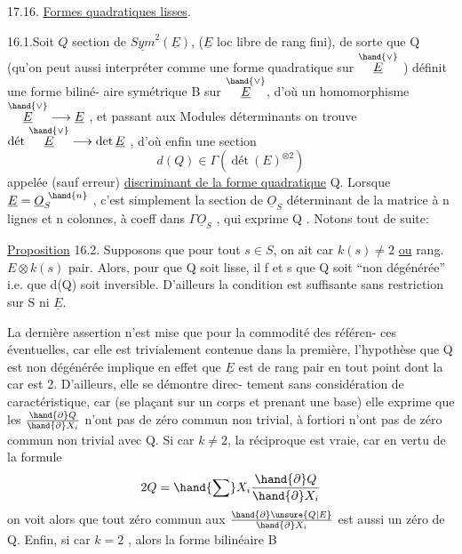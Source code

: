   

17.16. \uline{Formes quadratiques lisses}.

16.1.Soit $Q$  section de $\underline{Sym}^2(\underline{E})$, ($\underline{E}$ loc libre de rang fini),
de sorte que Q  (qu'on peut aussi interpréter comme une forme
quadratique sur $\overset{\hand{\vee}}{\underline{E}}$ )  définit une forme biliné-%
aire symétrique B sur $\overset{\hand{\vee}}{\underline{E}}$, d'où un homomorphisme $\overset{\hand{\vee}}{\underline{E}} \longrightarrow \underline{E}$ , et passant aux
Modules déterminants on trouve $\text{dét}\ \overset{\hand{\vee}}{\underline{E}} \longrightarrow \det \underline{E}$ , d'où enfin une section
\[ d(Q) \in \Gamma(\ \text{dét}\ (E)^{\otimes 2}) \]
appelée (sauf erreur) \uline{discriminant de la forme quadratique} Q. Lorsque
$\underline{E} = \underline{O}_S^{\ \hand{n}}$ , c'est simplement la section de $\underline{O}_S$ déterminant de la matrice
à n lignes et n colonnes, à coeff dans $\Gamma\underline{O}_S$ , qui exprime Q . Notons tout
de suite:

\uline{Proposition} 16.2. Supposons que pour tout $s \in S$, on ait car $k(s) \neq 2$ \uline{ou}
rang. $E\otimes k(s)$ pair. Alors, pour que Q soit lisse, il f et s que Q soit
``non dégénérée'' i.e. que d(Q) soit inversible. \hand{(}D'ailleurs la condition est
suffisante sans restriction sur S ni $\underline{E}$\hand{)}.

La dernière assertion n'est mise que pour la commodité des référen-%
ces éventuelles, car elle est trivialement contenue dans la première,
l'hypothèse que Q est non dégénérée implique en effet que $\underline{E}$ est de rang
pair en tout point dont la car est 2. D'ailleurs, elle se démontre direc-%
tement sans considération de caractéristique, car (se plaçant sur un corps
 et prenant une base) elle exprime que les $\frac{\hand{\partial} Q}{\hand{\partial} X_i}$ n'ont pas de zéro commun
non trivial, à fortiori  n'ont pas de zéro commun non trivial avec Q.
Si car $k \neq 2$, la réciproque est vraie, car en vertu de la formule
\[ 2Q = \hand{\sum} X_i \frac{\hand{\partial} Q}{\hand{\partial} X_i} \]
on voit alors que tout zéro commun aux $\frac{\hand{\partial} \unsure{Q|E}}{\hand{\partial} X_i}$ est aussi un zéro de Q. Enfin,
si car $k = 2$ ,  alors la forme bilinéaire B


